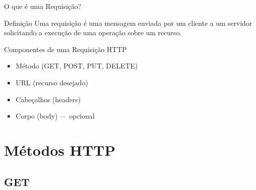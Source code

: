\documentclass[9pt]{beamer}
\begin{document}
\begin{frame}{O que é uma Requisição?}

\begin{block}{Definição}
Uma requisição é uma mensagem enviada por um cliente
a um servidor solicitando a execução de uma operação
sobre um recurso.
\end{block}

\begin{block}{Componentes de uma Requisição HTTP}
\begin{itemize}
    \item Método (GET, POST, PUT, DELETE)
    \item URL (recurso desejado)
    \item Cabeçalhos (headers)
    \item Corpo (body) — opcional
\end{itemize}
\end{block}

\begin{center}
\end{center}

\end{frame}
\section{Métodos HTTP}
\subsection{GET}
\end{document}
